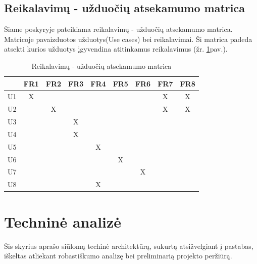 \documentclass{VUMIFPSkursinis}
\begin{document}
            \subsection{Reikalavimų - užduočių atsekamumo matrica}
            Šiame poskyryje pateikiama reikalavimų - užduočių atsekamumo matrica. Matricoje pavaizduotos užduotys(Use cases) bei reikalavimai. Ši matrica padeda atsekti kurios užduotys įgyvendina atitinkamus reikalavimus (žr. \ref{matrix2}pav.).
            \begin{table}[H]\footnotesize
                \centering
                \caption{Reikalavimų - užduočių atsekamumo matrica}
                \label{matrix2}
                {
                    \begin{tabular}{|c|c|c|c|c|c|c|c|c| }
                    \hline
                        & FR1 & FR2 & FR3 & FR4 & FR5 & FR6 & FR7 & FR8 \\ 
                    \hline
                     U1 & X   &     &     &     &     &     & X   & X    \\ 
                    \hline
                     U2 &     & X   &     &     &     &     & X   & X    \\  
                    \hline
                     U3 &     &     & X   &     &     &     &     &      \\ 
                    \hline
                     U4 &     &     & X   &     &     &     &     &      \\ 
                    \hline
                     U5 &     &     &     & X   &     &     &     &      \\ 
                    \hline
                     U6 &     &     &     &     & X   &     &     &      \\ 
                    \hline
                     U7 &     &     &     &     &     & X   &     &      \\ 
                    \hline
                     U8 &     &     &     & X   &     &     &     &      \\ 
                    \hline 
                    \end{tabular}
                }
            \end{table}
    \section{Techninė analizė}
      Šis skyrius aprašo siūlomą techinė architektūrą, sukurtą atsižvelgiant į pastabas, iškeltas atliekant robastiškumo analizę bei preliminarią projekto peržiūrą.
\end{document}
